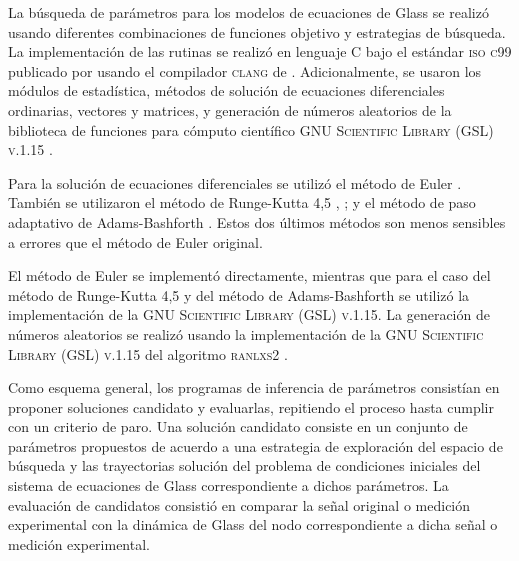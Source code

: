 La búsqueda de parámetros para los modelos de ecuaciones de Glass se realizó usando diferentes combinaciones de funciones objetivo y estrategias de búsqueda. La implementación de las rutinas se realizó en lenguaje C \citeauthor{Kernighan1988} \citep{Kernighan1988} bajo el estándar \textsc{iso c99} publicado por  \citeauthor{c99} \citep{c99} usando el compilador \textsc{clang} de \citeauthor{clang} \citep{clang}. Adicionalmente, se usaron los módulos de estadística, métodos de solución de ecuaciones diferenciales ordinarias, vectores y matrices, y generación de números aleatorios de la biblioteca de funciones para cómputo científico \textsc{GNU Scientific Library (GSL) v.1.15} \citeauthor{gslManual} \citep{gslManual}.

Para la solución de ecuaciones diferenciales se utilizó el método de Euler \citeauthor{numrecipesc} \citep{numrecipesc}. También se utilizaron el método de Runge-Kutta 4,5 \citeauthor{numrecipesc} \citep{numrecipesc}, \citeauthor{gslManual} \citep{gslManual}; y el método de paso adaptativo de Adams-Bashforth \citep{gslManual}. Estos dos últimos métodos son menos sensibles a errores que el método de Euler original.

El método de Euler se implementó directamente, mientras que para el caso del método de Runge-Kutta 4,5 y del método de Adams-Bashforth se utilizó la implementación de la \textsc{GNU Scientific Library (GSL) v.1.15}. La generación de números aleatorios se realizó usando la implementación de la \textsc{GNU Scientific Library (GSL) v.1.15} del algoritmo \textsc{ranlxs2} \citeauthor{gslManual} \citep{gslManual}.

Como esquema general, los programas de inferencia de parámetros consistían en proponer soluciones candidato y evaluarlas, repitiendo el proceso hasta cumplir con un criterio de paro. Una solución candidato consiste en un conjunto de parámetros propuestos de acuerdo a una estrategia de exploración del espacio de búsqueda y las trayectorias solución del problema de condiciones iniciales del sistema de ecuaciones de Glass correspondiente a dichos parámetros. La evaluación de candidatos consistió en comparar la señal original o medición experimental con la dinámica de Glass del nodo correspondiente a dicha señal o medición experimental.


